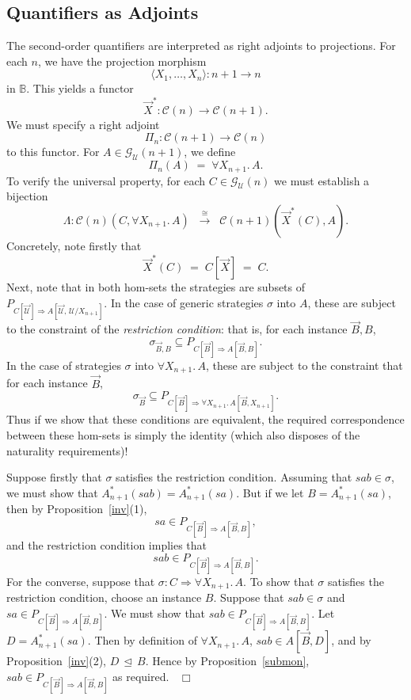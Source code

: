 \documentclass[a4paper,11pt]{article}
\newcommand{\UU}{\mathcal{U}}
\newcommand{\ginc}{\, \trianglelefteq \,}
\newcommand{\ICC}{\mathcal{C}}
\newcommand{\GU}[1]{\mathcal{G}_{\UU}(#1)}
\newcommand{\Base}{\mathbb{B}}
\begin{document}
\subsection{Quantifiers as Adjoints}
The second-order quantifiers are interpreted as right adjoints to
projections.
For each $n$, we have the projection morphism
\[ \langle X_1 , \ldots , X_n \rangle : n+1 \longrightarrow n \]
in $\Base$. This yields a functor
\[ \vec{X}^{\ast} : \ICC (n) \longrightarrow \ICC (n+1) . \]
We must specify a right adjoint
\[ \Pi_n : \ICC (n+1) \longrightarrow \ICC (n) \]
to this functor.
For $A \in \GU{n+1}$, we define
\[ \Pi_n (A) \; = \; \forall X_{n+1}. \, A . \]
To verify the universal property, for each $C \in \GU{n}$ we must
establish a bijection
\[ \Lambda : \ICC (n) (C, \forall X_{n+1}. \, A) \;\; \stackrel{\cong}{\longrightarrow} \;\; \ICC
(n+1)(\vec{X}^{\ast}(C), A) . \]
Concretely, note firstly that
\[ \vec{X}^{\ast}(C) \; = \; C[\vec{X}] \; = \; C . \]
Next, note that in both hom-sets the strategies are subsets of $P_{C[\vec{\UU}]
  \Rightarrow A[\vec{\UU},\, \UU/X_{n+1}]}$. In the case of generic strategies
  $\sigma$ into
  $A$, these are subject to the constraint of the \emph{restriction
    condition}: that is, for each instance $\vec{B},B$,
\[ \sigma_{\vec{B},B} \subseteq P_{C[\vec{B}] \Rightarrow
  A[\vec{B},B]} . \]
In the case of
  strategies $\sigma$ into $\forall X_{n+1}. \, A$, these are subject to the
  constraint that for each instance $\vec{B}$,
\[ \sigma_{\vec{B}} \subseteq P_{C[\vec{B}] \Rightarrow \forall
  X_{n+1}. \, A[\vec{B}, X_{n+1}]} . \]
Thus if we show that these conditions are equivalent, the required
correspondence between these hom-sets is simply the identity (which
also disposes of the naturality requirements)!

Suppose firstly that $\sigma$ satisfies the restriction
condition. Assuming that $sab \in \sigma$, we must show that
$A^{\ast}_{n+1}(sab) = A^{\ast}_{n+1}(sa)$. But if we let $B =
A^{\ast}_{n+1}(sa)$, then by Proposition~\ref{inv}(1),
\[ sa
\in P_{C[\vec{B}] \Rightarrow
  A[\vec{B},B]} , \]
and the restriction condition implies that
\[ sab
\in P_{C[\vec{B}] \Rightarrow
  A[\vec{B},B]} . \]
For the converse, suppose that $\sigma : C \Rightarrow \forall
X_{n+1}. \, A$. To show that $\sigma$ satisfies the restriction
condition, choose an instance $B$. Suppose that $sab \in \sigma$ and $sa \in
P_{C[\vec{B}] \Rightarrow A[\vec{B},B]}$. We must show that
$sab \in
P_{C[\vec{B}] \Rightarrow A[\vec{B},B]}$. Let $D =
    A^{\ast}_{n+1}(sa)$. Then by definition of $\forall X_{n+1}. \, A$,
    $sab \in A[\vec{B},D]$, and by Proposition~\ref{inv}(2), $D \ginc
    B$. Hence by Proposition~\ref{submon}, $sab \in
P_{C[\vec{B}] \Rightarrow A[\vec{B},B]}$ as required. $\;\; \Box$
\end{document}
